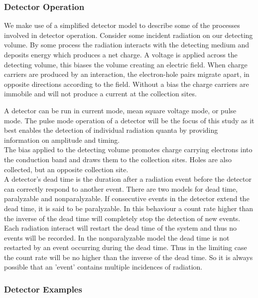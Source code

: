 \documentclass[12pt]{article}
\begin{document}
\begin{doublespacing}
\subsubsection{Detector Operation}
We make use of a simplified detector model to describe some of the processes involved in detector operation.
Consider some incident radiation on our detecting volume. 
By some process the radiation interacts with the detecting medium and deposits energy which produces a net charge. 
A voltage is applied across the detecting volume, this biases the volume creating an electric field. 
When charge carriers are produced by an interaction, the electron-hole pairs migrate apart, in opposite directions according to the field. 
Without a bias the charge carriers are immobile and will not produce a current at the collection sites.

A detector can be run in current mode, mean square voltage mode, or pulse mode. 
The pulse mode operation of a detector will be the focus of this study as it best enables the detection of individual radiation quanta by providing information on amplitude and timing.
\\

The bias applied to the detecting volume promotes charge carrying electrons into the conduction band and draws them to the collection sites. 
Holes are also collected, but an opposite collection site.
\\

A detector's dead time is the duration after a radiation event before the detector can correctly respond to another event.
There are two models for dead time, paralyzable and nonparalyzable. 
If consecutive events in the detector extend the dead time, it is said to be paralyzable. 
In this behaviour a count rate higher than the inverse of the dead time will completely stop the detection of new events. 
Each radiation interact will restart the dead time of the system and thus no events will be recorded. 
In the nonparalyzable model the dead time is not restarted by an event occurring during the dead time. 
Thus in the limiting case the count rate will be no higher than the inverse of the dead time.
So it is always possible that an 'event' contains multiple incidences of radiation.
\\

\subsubsection{Detector Examples}


\end{doublespacing}
\end{document}
